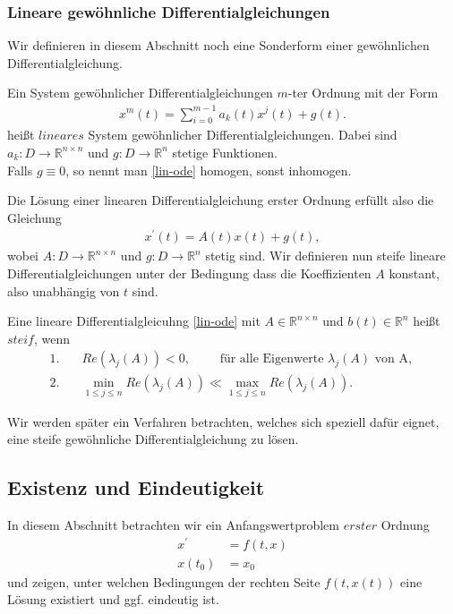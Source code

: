 \subsubsection{Lineare gewöhnliche Differentialgleichungen}
Wir definieren in diesem Abschnitt noch eine Sonderform einer gewöhnlichen Differentialgleichung.
\begin{definition}
    Ein System gewöhnlicher Differentialgleichungen $m$-ter Ordnung mit der Form
    \begin{align} \label{lin-ode}
    x^{m}(t) = \sum_{i=0}^{m-1} a_k(t) x^{j}(t) + g(t).
    \end{align}
    heißt $lineares$ System gewöhnlicher Differentialgleichungen.
    Dabei sind $a_k : D \rightarrow \mathbb{R}^{n \times n}$ und $g : D \rightarrow \mathbb{R}^n$ stetige Funktionen.\\
    Falls $g \equiv 0$, so nennt man \eqref{lin-ode} homogen, sonst inhomogen.
\end{definition}
Die Lösung einer linearen Differentialgleichung erster Ordnung erfüllt also die Gleichung
\begin{align}
    \label{linear-first-order-ode}
    x^{\prime}(t) = A(t)x(t) + g(t),
\end{align}
wobei $A:D \rightarrow \mathbb{R}^{n \times n}$ und $g:D \rightarrow \mathbb{R}^n$ stetig sind. Wir definieren nun steife lineare 
Differentialgleichungen unter der Bedingung dass die Koeffizienten $A$ konstant, also unabhängig von $t$ sind.
\begin{definition}
    \label{steife-dgl}
    Eine lineare Differentialgleicuhng \eqref{lin-ode} mit $A \in \mathbb{R}^{n \times n}$ und
    $b(t) \in \mathbb{R}^n$ heißt $steif$, wenn
    \begin{align}
        1.& \quad Re(\lambda_j(A)) < 0, \qquad \text{ für alle Eigenwerte } \lambda_j(A) \text{ von A, }\\
        2.& \quad \min\limits_{1 \leq j \leq n} Re(\lambda_j(A)) \ll \max\limits_{1 \leq j \leq n} Re(\lambda_j(A)).
    \end{align}
\end{definition}
Wir werden später ein Verfahren betrachten, welches sich speziell dafür eignet, eine steife gewöhnliche
Differentialgleichung zu lösen.

\subsection{Existenz und Eindeutigkeit}
In diesem Abschnitt betrachten wir ein Anfangswertproblem $erster$ Ordnung
\begin{align}
    x^{\prime}&=f(t,x) \nonumber \\
    x(t_{0})&=x_{0} \label{firstorder-ode}
\end{align}
und zeigen, unter welchen Bedingungen der rechten Seite $f(t,x(t))$ eine Lösung existiert und ggf. eindeutig ist.

